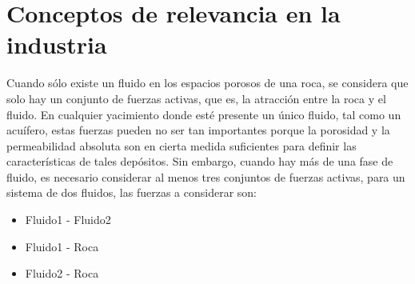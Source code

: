 %




\section{Conceptos de relevancia en la industria}
Cuando sólo existe un fluido en los espacios porosos de una roca, se considera que solo hay un conjunto de fuerzas activas, que es, la atracción entre la roca y el fluido. En cualquier yacimiento donde esté presente un único fluido, tal como un acuífero, estas fuerzas pueden no ser tan importantes porque la porosidad y la permeabilidad absoluta son en cierta medida suficientes para definir las características de tales depósitos. Sin embargo, cuando hay más de una fase de fluido, es necesario considerar al menos tres conjuntos de fuerzas activas, para un sistema de dos fluidos, las fuerzas a considerar son:
\begin{itemize}
    \item{Fluido1 - Fluido2}
    \item{Fluido1 - Roca}
    \item{Fluido2 - Roca}
\end{itemize}

